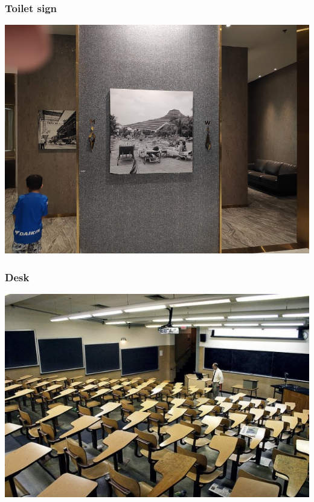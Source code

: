 \documentclass{beamer}
\begin{document}
\begin{frame}
\frametitle{Toilet sign}
%	
	\centering
	\includegraphics[width=0.8\linewidth]{toilet}
%	
\end{frame}

\begin{frame}
	\frametitle{Desk}
%		
		\centering
		\includegraphics[width=0.8\linewidth]{desk}
%		
\end{frame}
\end{document}
